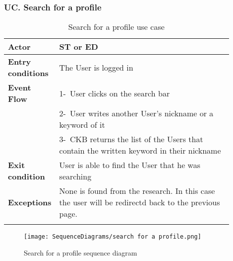 \subsubsection*{UC\cuc . Search for a profile}
\begin{center}
    \begin{longtable}{|l|p{0.9\linewidth}|}
        \hline
        \textbf{Actor}            & ST or ED                                                                                                                                                                                       \\
        \hline
        \textbf{Entry conditions} & The User is logged in  \\
        \hline
        \textbf{Event Flow}       & 1-\ User clicks on the search bar        \\
        & 2-\ User writes another User's nickname or a keyword of it \\
        & 3-\ CKB returns the list of the Users that contain the written keyword in their nickname         \\
        \hline
        \textbf{Exit condition}   & User is able to find the User that he was searching        \\
        \hline
        \textbf{Exceptions}        &  None is found from the research. In this case the user will be redirectd back to the previous page.\\
        \hline
        \caption{Search for a profile use case}
        \label{tab: search_for_a_profile_use_case}
    \end{longtable}
\end{center}

\begin{figure}[H]
    \begin{center}
        \texttt{[image: SequenceDiagrams/search for a profile.png]}
        \caption{Search for a profile sequence diagram}
        \label{fig:search_for_a_profile_seqd}%
    \end{center}
\end{figure}

